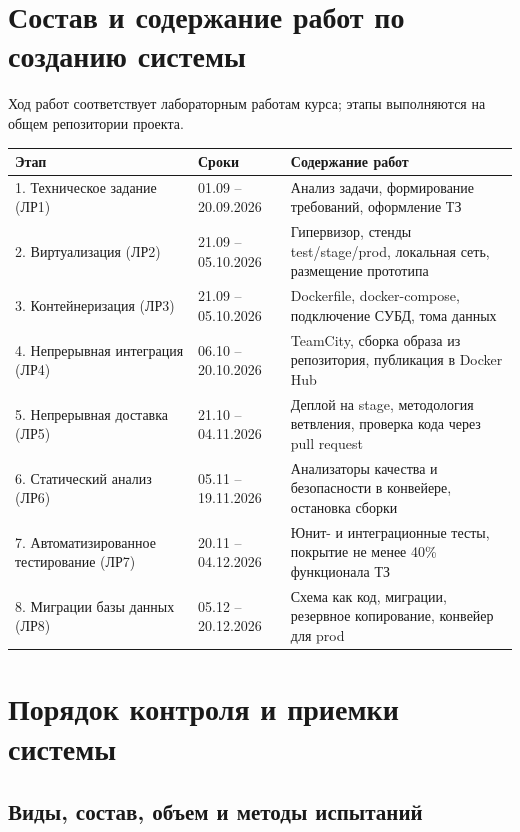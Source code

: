 \documentclass[14pt, a4paper]{extarticle}
\begin{document}
\section{Состав и содержание работ по созданию системы}

Ход работ соответствует лабораторным работам курса; этапы выполняются на общем репозитории проекта.

\begin{longtable}{|p{4.7cm}|p{3.1cm}|p{6cm}|}
\hline
\textbf{Этап} & \textbf{Сроки} & \textbf{Содержание работ} \\
\hline
\endhead
1. Техническое задание (ЛР1) & 01.09 -- 20.09.2026 & Анализ задачи, формирование требований, оформление ТЗ \\
\hline
2. Виртуализация (ЛР2) & 21.09 -- 05.10.2026 & Гипервизор, стенды test/stage/prod, локальная сеть, размещение прототипа \\
\hline
3. Контейнеризация (ЛР3) & 21.09 -- 05.10.2026 & Dockerfile, docker-compose, подключение СУБД, тома данных \\
\hline
4. Непрерывная интеграция (ЛР4) & 06.10 -- 20.10.2026 & TeamCity, сборка образа из репозитория, публикация в Docker Hub \\
\hline
5. Непрерывная доставка (ЛР5) & 21.10 -- 04.11.2026 & Деплой на stage, методология ветвления, проверка кода через pull request \\
\hline
6. Статический анализ (ЛР6) & 05.11 -- 19.11.2026 & Анализаторы качества и безопасности в конвейере, остановка сборки \\
\hline
7. Автоматизированное тестирование (ЛР7) & 20.11 -- 04.12.2026 & Юнит- и интеграционные тесты, покрытие не менее 40\% функционала ТЗ \\
\hline
8. Миграции базы данных (ЛР8) & 05.12 -- 20.12.2026 & Схема как код, миграции, резервное копирование, конвейер для prod \\
\hline
\end{longtable}

\section{Порядок контроля и приемки системы}

\subsection{Виды, состав, объем и методы испытаний}
\end{document}
